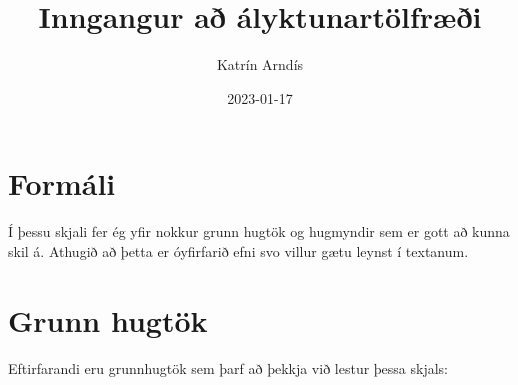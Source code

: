 \documentclass[
]{book}
\title{Inngangur að ályktunartölfræði}
\author{Katrín Arndís}
\date{2023-01-17}
\theoremstyle{definition}
\theoremstyle{definition}
\theoremstyle{definition}
\theoremstyle{definition}
\theoremstyle{remark}
\begin{document}
\maketitle

{
\setcounter{tocdepth}{1}
\tableofcontents
}
\hypertarget{formuxe1li}{%
\chapter{Formáli}\label{formuxe1li}}

Í þessu skjali fer ég yfir nokkur grunn hugtök og hugmyndir sem er gott að kunna skil á. Athugið að þetta er óyfirfarið efni svo villur gætu leynst í textanum.

\hypertarget{grunn-hugtuxf6k}{%
\chapter{Grunn hugtök}\label{grunn-hugtuxf6k}}

Eftirfarandi eru grunnhugtök sem þarf að þekkja við lestur þessa skjals:
\end{document}
